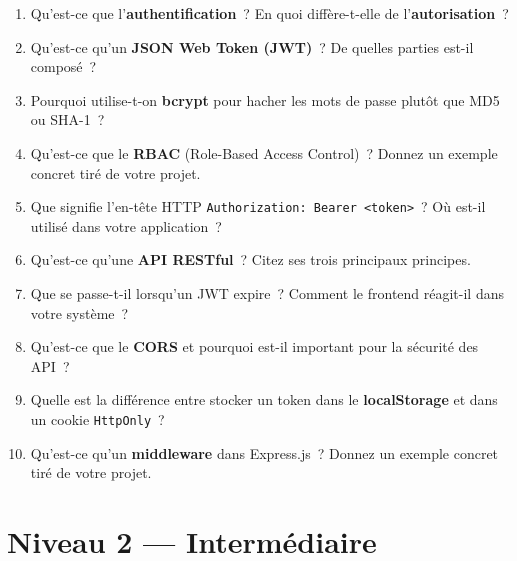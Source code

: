 \documentclass[12pt,a4paper,oneside]{report}
\begin{document}
\begin{enumerate}[
  leftmargin=1.5cm,
  label=\textcolor{EasyGreen}{\textbf{Q\arabic*.}},
  itemsep=10pt
]

\item Qu'est-ce que l'\textbf{authentification}~? En quoi diffère-t-elle
      de l'\textbf{autorisation}~?

\item Qu'est-ce qu'un \textbf{JSON Web Token (JWT)}~? De quelles parties
      est-il composé~?

\item Pourquoi utilise-t-on \textbf{bcrypt} pour hacher les mots de passe
      plutôt que MD5 ou SHA-1~?

\item Qu'est-ce que le \textbf{RBAC} (Role-Based Access Control)~?
      Donnez un exemple concret tiré de votre projet.

\item Que signifie l'en-tête HTTP
      \texttt{Authorization: Bearer <token>}~? Où est-il utilisé dans
      votre application~?

\item Qu'est-ce qu'une \textbf{API RESTful}~? Citez ses trois principaux
      principes.

\item Que se passe-t-il lorsqu'un JWT expire~? Comment le frontend
      réagit-il dans votre système~?

\item Qu'est-ce que le \textbf{CORS} et pourquoi est-il important pour
      la sécurité des API~?

\item Quelle est la différence entre stocker un token dans le
      \textbf{localStorage} et dans un cookie \texttt{HttpOnly}~?

\item Qu'est-ce qu'un \textbf{middleware} dans Express.js~? Donnez un
      exemple concret tiré de votre projet.

\end{enumerate}

\vspace{0.8cm}

\section*{\textcolor{MedBlue}{Niveau 2 --- Intermédiaire}}
\end{document}
